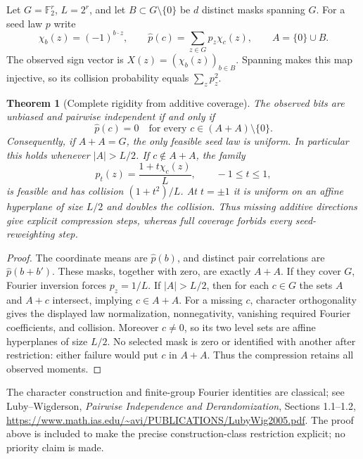 \documentclass[11pt]{article}
\newtheorem{theorem}{Theorem}[section]
\begin{document}
Let $G=\mathbb F_2^r$, $L=2^r$, and let
$B\subset G\setminus\{0\}$ be $d$ distinct masks spanning $G$.
For a seed law $p$ write
\[
 \chi_b(z)=(-1)^{b\cdot z},\qquad
 \widehat p(c)=\sum_{z\in G}p_z\chi_c(z),\qquad
 A=\{0\}\cup B.
\]
The observed sign vector is $X(z)=(\chi_b(z))_{b\in B}$.
Spanning makes this map injective, so its collision probability equals
$\sum_zp_z^2$.

\begin{theorem}[Complete rigidity from additive coverage]
\label{thm:character-cover}
The observed bits are unbiased and pairwise independent if and only if
\[
 \widehat p(c)=0\quad\text{for every }c\in(A+A)\setminus\{0\}.
\]
Consequently, if $A+A=G$, the only feasible seed law is uniform.
In particular this holds whenever $|A|>L/2$.
If $c\notin A+A$, the family
\[
 p_t(z)=\frac{1+t\chi_c(z)}L,\qquad -1\le t\le1,
\]
is feasible and has collision $(1+t^2)/L$. At $t=\pm1$ it is uniform
on an affine hyperplane of size $L/2$ and doubles the collision.
Thus missing additive directions give explicit compression steps,
whereas full coverage forbids every seed-reweighting step.
\end{theorem}
\begin{proof}
The coordinate means are $\widehat p(b)$, and distinct pair
correlations are $\widehat p(b+b')$. These masks, together with zero,
are exactly $A+A$. If they cover $G$, Fourier inversion forces
$p_z=1/L$. If $|A|>L/2$, then for each $c\in G$ the sets
$A$ and $A+c$ intersect, implying $c\in A+A$.
For a missing $c$, character orthogonality gives the displayed law
normalization, nonnegativity, vanishing required Fourier coefficients,
and collision. Moreover $c\ne0$, so its two level sets are affine
hyperplanes of size $L/2$. No selected mask is zero or identified
with another after restriction: either failure would put $c$ in
$A+A$. Thus the compression retains all observed moments.
\end{proof}

The character construction and finite-group Fourier identities are
classical; see Luby--Wigderson, \emph{Pairwise Independence and
Derandomization}, Sections 1.1--1.2,
\url{https://www.math.ias.edu/~avi/PUBLICATIONS/LubyWig2005.pdf}.
The proof above is included to make the precise construction-class
restriction explicit; no priority claim is made.
\end{document}
